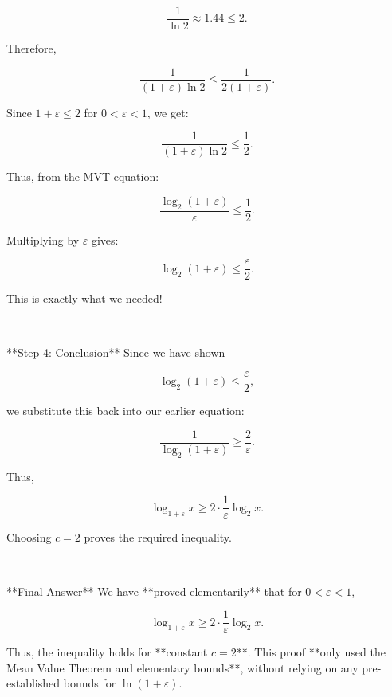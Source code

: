 {       \[
       \frac{1}{\ln 2} \approx 1.44 \leq 2.
       \]
       
       Therefore,
       
       \[
       \frac{1}{(1+\varepsilon) \ln 2} \leq \frac{1}{2(1+\varepsilon)}.
       \]
       
       Since \( 1+\varepsilon \leq 2 \) for \( 0 < \varepsilon < 1 \), we get:
       
       \[
       \frac{1}{(1+\varepsilon) \ln 2} \leq \frac{1}{2}.
       \]
       
       Thus, from the MVT equation:
       
       \[
       \frac{\log_2(1+\varepsilon)}{\varepsilon} \leq \frac{1}{2}.
       \]
       
       Multiplying by \( \varepsilon \) gives:
       
       \[
       \log_2(1+\varepsilon) \leq \frac{\varepsilon}{2}.
       \]
       
       This is exactly what we needed!
       
       ---
       
         **Step 4: Conclusion**
       Since we have shown
       
       \[
       \log_2(1+\varepsilon) \leq \frac{\varepsilon}{2},
       \]
       
       we substitute this back into our earlier equation:
       
       \[
       \frac{1}{\log_2(1+\varepsilon)} \geq \frac{2}{\varepsilon}.
       \]
       
       Thus,
       
       \[
       \log_{1+\varepsilon} x \geq 2 \cdot \frac{1}{\varepsilon} \log_2 x.
       \]
       
       Choosing \( c = 2 \) proves the required inequality.
       
---

  **Final Answer**
We have **proved elementarily** that for \( 0 < \varepsilon < 1 \),

\[
\log_{1+\varepsilon} x \geq 2 \cdot \frac{1}{\varepsilon} \log_2 x.
\]

Thus, the inequality holds for **constant \( c = 2 \)**. This proof **only used the Mean Value Theorem and elementary bounds**, without relying on any pre-established bounds for \( \ln(1+\varepsilon) \).
} %

% 



